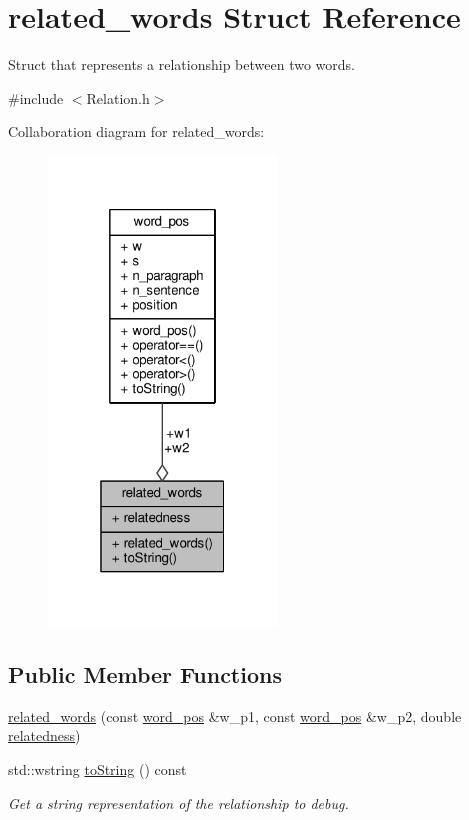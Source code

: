 \hypertarget{structrelated__words}{}\section{related\+\_\+words Struct Reference}
\label{structrelated__words}


Struct that represents a relationship between two words.  




{\ttfamily \#include $<$Relation.\+h$>$}



Collaboration diagram for related\+\_\+words\+:
\nopagebreak
\begin{figure}[H]
\begin{center}
\leavevmode
\includegraphics[width=172pt]{structrelated__words__coll__graph}
\end{center}
\end{figure}
\subsection*{Public Member Functions}
\begin{DoxyCompactItemize}
\item 
\hyperlink{structrelated__words_a0f35724f6fcc5cad5666b7b32c3cd36f}{related\+\_\+words} (const \hyperlink{structword__pos}{word\+\_\+pos} \&w\+\_\+p1, const \hyperlink{structword__pos}{word\+\_\+pos} \&w\+\_\+p2, double \hyperlink{structrelated__words_aefbff0c852fe59008f43f2c921b42330}{relatedness})
\item 
std\+::wstring \hyperlink{structrelated__words_a4feeb3a32b398b9b1f31197431bd0002}{to\+String} () const 
\begin{DoxyCompactList}\small\item\em Get a string representation of the relationship to debug. \end{DoxyCompactList}\end{DoxyCompactItemize}
